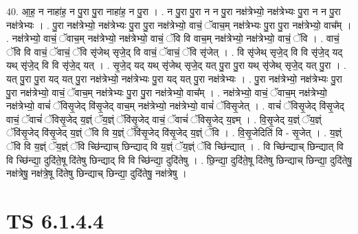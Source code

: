 \documentclass[17pt]{extarticle}
\begin{document}
40. आ॒ह॒ न नाहा॑ह॒ न पु॒रा पु॒रा नाहा॑ह॒ न पु॒रा । . न पु॒रा पु॒रा न न पु॒रा नक्ष॑त्रेभ्यो॒ नक्ष॑त्रेभ्यः पु॒रा न न पु॒रा नक्ष॑त्रेभ्यः । . पु॒रा नक्ष॑त्रेभ्यो॒ नक्ष॑त्रेभ्यः पु॒रा पु॒रा नक्ष॑त्रेभ्यो॒ वाचं॒ ॅवाच॒म् नक्ष॑त्रेभ्यः पु॒रा पु॒रा नक्ष॑त्रेभ्यो॒ वाच᳚म् । . नक्ष॑त्रेभ्यो॒ वाचं॒ ॅवाच॒म् नक्ष॑त्रेभ्यो॒ नक्ष॑त्रेभ्यो॒ वाचं॒ ॅवि वि वाच॒म् नक्ष॑त्रेभ्यो॒ नक्ष॑त्रेभ्यो॒ वाचं॒ ॅवि । . वाचं॒ ॅवि वि वाचं॒ ॅवाचं॒ ॅवि सृ॑जेथ् सृजे॒द् वि वाचं॒ ॅवाचं॒ ॅवि सृ॑जेत् । . वि सृ॑जेथ् सृजे॒द् वि वि सृ॑जे॒द् यद् यथ् सृ॑जे॒द् वि वि सृ॑जे॒द् यत् । . सृ॒जे॒द् यद् यथ् सृ॑जेथ् सृजे॒द् यत् पु॒रा पु॒रा यथ् सृ॑जेथ् सृजे॒द् यत् पु॒रा । . यत् पु॒रा पु॒रा यद् यत् पु॒रा नक्ष॑त्रेभ्यो॒ नक्ष॑त्रेभ्यः पु॒रा यद् यत् पु॒रा नक्ष॑त्रेभ्यः । . पु॒रा नक्ष॑त्रेभ्यो॒ नक्ष॑त्रेभ्यः पु॒रा पु॒रा नक्ष॑त्रेभ्यो॒ वाचं॒ ॅवाच॒म् नक्ष॑त्रेभ्यः पु॒रा पु॒रा नक्ष॑त्रेभ्यो॒ वाच᳚म् । . नक्ष॑त्रेभ्यो॒ वाचं॒ ॅवाच॒म् नक्ष॑त्रेभ्यो॒ नक्ष॑त्रेभ्यो॒ वाचं॑ ॅविसृ॒जेद् वि॑सृ॒जेद् वाच॒म् नक्ष॑त्रेभ्यो॒ नक्ष॑त्रेभ्यो॒ वाचं॑ ॅविसृ॒जेत् । . वाचं॑ ॅविसृ॒जेद् वि॑सृ॒जेद् वाचं॒ ॅवाचं॑ ॅविसृ॒जेद् य॒ज्ञ्ं ॅय॒ज्ञ्ं ॅवि॑सृ॒जेद् वाचं॒ ॅवाचं॑ ॅविसृ॒जेद् य॒ज्ञ्म् । . वि॒सृ॒जेद् य॒ज्ञ्ं ॅय॒ज्ञ्ं ॅवि॑सृ॒जेद् वि॑सृ॒जेद् य॒ज्ञ्ं ॅवि वि य॒ज्ञ्ं ॅवि॑सृ॒जेद् वि॑सृ॒जेद् य॒ज्ञ्ं ॅवि । . वि॒सृ॒जेदिति॑ वि - सृ॒जेत् । . य॒ज्ञ्ं ॅवि वि य॒ज्ञ्ं ॅय॒ज्ञ्ं ॅवि च्छि॑न्द्याच् छिन्द्याद् वि य॒ज्ञ्ं ॅय॒ज्ञ्ं ॅवि च्छि॑न्द्यात् । . वि च्छि॑न्द्याच् छिन्द्यात् वि वि च्छि॑न्द्या॒ दुदि॑ते॒षू दि॑तेषु छिन्द्याद् वि वि च्छि॑न्द्या॒ दुदि॑तेषु । . छि॒न्द्या॒ दुदि॑ते॒षू दि॑तेषु छिन्द्याच् छिन्द्या॒ दुदि॑तेषु॒ नक्ष॑त्रेषु॒ नक्ष॑त्रे॒षू दि॑तेषु छिन्द्याच् छिन्द्या॒ दुदि॑तेषु॒ नक्ष॑त्रेषु । \newline
\pagebreak
{}

\section{ TS 6.1.4.4 }
\end{document}
